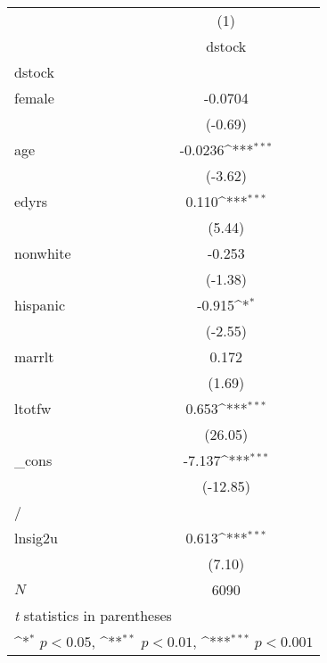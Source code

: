 {
\def\sym#1{\ifmmode^{#1}\else\(^{#1}\)\fi}
\begin{tabular}{l*{1}{c}}
\hline\hline
            &\multicolumn{1}{c}{(1)}\\
            &\multicolumn{1}{c}{dstock}\\
\hline
dstock      &                     \\
female      &     -0.0704         \\
            &     (-0.69)         \\
[1em]
age         &     -0.0236\sym{***}\\
            &     (-3.62)         \\
[1em]
edyrs       &       0.110\sym{***}\\
            &      (5.44)         \\
[1em]
nonwhite    &      -0.253         \\
            &     (-1.38)         \\
[1em]
hispanic    &      -0.915\sym{*}  \\
            &     (-2.55)         \\
[1em]
marrlt      &       0.172         \\
            &      (1.69)         \\
[1em]
ltotfw      &       0.653\sym{***}\\
            &     (26.05)         \\
[1em]
\_cons      &      -7.137\sym{***}\\
            &    (-12.85)         \\
\hline
/           &                     \\
lnsig2u     &       0.613\sym{***}\\
            &      (7.10)         \\
\hline
\(N\)       &        6090         \\
\hline\hline
\multicolumn{2}{l}{\footnotesize \textit{t} statistics in parentheses}\\
\multicolumn{2}{l}{\footnotesize \sym{*} \(p<0.05\), \sym{**} \(p<0.01\), \sym{***} \(p<0.001\)}\\
\end{tabular}
}
